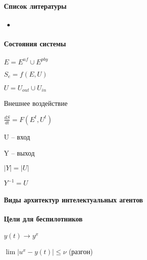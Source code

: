 \documentclass[a4paper]{article}
\begin{document}
\paragraph{Список литературы}
\begin{itemize}
  \item
\end{itemize}

\paragraph{Состояния системы}
\begin{center}
$E = E^{uf} \cup E^{pby}$
\par
$S_e = f(E, U)$
\par
$U = U_{out} \cup U_{in}$
\par
Внешнее воздействие
\par
$\frac{dS}{dt}= F(E^t, U^t)$

\end{center}
\par
U -- вход
\par
Y -- выход
\par
$|Y| = |U|$ 
\par
$Y^{-1} = U$

\paragraph{Виды архитектур интелектуальных агентов}
\begin{itemize}
\end{itemize}
\paragraph{Цели для беспилотников}
\begin{enumerate}
  \par
  $y(t) \to y^x$ 
  \par$\lim |u^x - y(t)| \le \nu$
   (разгон)
\end{enumerate}
\end{document}
